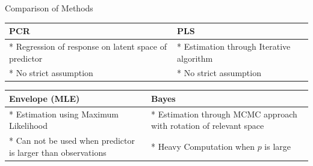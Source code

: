 \documentclass[ignorenonframetext,]{beamer}
\begin{document}
\begin{frame}{Comparison of Methods}

\begin{longtable}[]{@{}ll@{}}
\toprule
\begin{minipage}[b]{0.53\columnwidth}\raggedright\strut
PCR
\strut\end{minipage} &
\begin{minipage}[b]{0.41\columnwidth}\raggedright\strut
PLS
\strut\end{minipage}\tabularnewline
\midrule
\endhead
\begin{minipage}[t]{0.53\columnwidth}\raggedright\strut
* Regression of response on latent space of predictor
\strut\end{minipage} &
\begin{minipage}[t]{0.41\columnwidth}\raggedright\strut
* Estimation through Iterative algorithm
\strut\end{minipage}\tabularnewline
\begin{minipage}[t]{0.53\columnwidth}\raggedright\strut
* No strict assumption
\strut\end{minipage} &
\begin{minipage}[t]{0.41\columnwidth}\raggedright\strut
* No strict assumption
\strut\end{minipage}\tabularnewline
\bottomrule
\end{longtable}

\pause

\begin{longtable}[]{@{}ll@{}}
\toprule
\begin{minipage}[b]{0.45\columnwidth}\raggedright\strut
Envelope (MLE)
\strut\end{minipage} &
\begin{minipage}[b]{0.49\columnwidth}\raggedright\strut
Bayes
\strut\end{minipage}\tabularnewline
\midrule
\endhead
\begin{minipage}[t]{0.45\columnwidth}\raggedright\strut
* Estimation using Maximum Likelihood
\strut\end{minipage} &
\begin{minipage}[t]{0.49\columnwidth}\raggedright\strut
* Estimation through MCMC approach with rotation of relevant space
\strut\end{minipage}\tabularnewline
\begin{minipage}[t]{0.45\columnwidth}\raggedright\strut
* Can not be used when predictor is larger than observations
\strut\end{minipage} &
\begin{minipage}[t]{0.49\columnwidth}\raggedright\strut
* Heavy Computation when \(p\) is large
\strut\end{minipage}\tabularnewline
\bottomrule
\end{longtable}

\end{frame}
\end{document}
